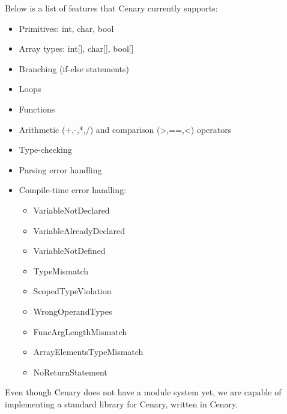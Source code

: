 \documentclass[landscape,a1paper,fontscale=0.485]{baposter} %
\begin{document}
\begin{poster}
{Below is a list of features that Cenary currently supports:
\begin{itemize}
\item Primitives: int, char, bool
\item Array types: int[], char[], bool[]
\item Branching (if-else statements)
\item Loops
\item Functions
\item Arithmetic (+,-,*,/) and comparison (>,==,<) operators
\item Type-checking
\item Parsing error handling
\item Compile-time error handling:
\begin{itemize}
  \item VariableNotDeclared
  \item VariableAlreadyDeclared
  \item VariableNotDefined
  \item TypeMismatch
  \item ScopedTypeViolation
  \item WrongOperandTypes
  \item FuncArgLengthMismatch
  \item ArrayElementsTypeMismatch
  \item NoReturnStatement
\end{itemize}
\end{itemize}
}

Even though Cenary does not have a module system yet, we are capable of implementing a standard library for Cenary, written in Cenary.

\end{poster}
\end{document}
